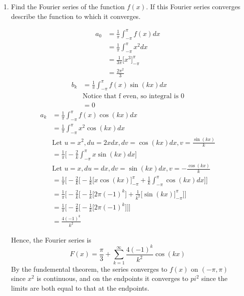 \documentclass{article}
\begin{document}
\begin{enumerate}
\begin{enumerate}
\item Find the Fourier series of the function $f(x)$. If this Fourier series converges describe the function to which it converges.
\begin{multicols}{2}
    \noindent
    \begin{align*}
        a_0 &= \frac{1}{\pi} \int_{-\pi}^{\pi} f(x) dx\\
        &= \frac{1}{\pi} \int_{-\pi}^{\pi} x^2 dx\\
        &= \frac{1}{3\pi} \Big[x^3 \Big]_{-\pi}^{\pi}\\
        &= \frac{2\pi^2}{3}
    \end{align*}
    \begin{align*}
        b_k &= \frac{1}{\pi} \int_{-\pi}^{\pi}f(x)\sin(kx)dx \\
        &\text{Notice that f even, so integral is 0} \\
        &= 0
    \end{align*}
    \begin{align*}
        a_k &= \frac{1}{\pi} \int_{-\pi}^{\pi}f(x)\cos(kx) dx \\
        &= \frac{1}{\pi} \int_{-\pi}^{\pi}x^2\cos(kx) dx \\
        &\text{Let $u = x^2, du = 2xdx, dv = \cos(kx) dx, v = \frac{\sin(kx)}{k}$} \\
        &= \frac{1}{\pi} \Bigg[- \frac{2}{k}\int_{-\pi}^{\pi}x\sin(kx)dx\Bigg] \\
        &\text{Let $u = x, du = dx, dv = \sin(kx) dx, v = -\frac{\cos(kx)}{k}$} \\
        &= \frac{1}{\pi} \Bigg[- \frac{2}{k}\Big[ -\frac{1}{k}\Big[x\cos(kx)\Big]_{-\pi}^{\pi} + \frac{1}{k}\int_{-\pi}^{\pi}\cos(kx)dx \Big]\Bigg] \\
        &= \frac{1}{\pi} \Bigg[- \frac{2}{k}\Big[ -\frac{1}{k}\Big[2\pi(-1)^k\Big] + \frac{1}{k^2}\Big[\sin(kx)\Big]_{-\pi}^{\pi}\Big]\Bigg] \\
        &= \frac{1}{\pi} \Bigg[- \frac{2}{k}\Big[ -\frac{1}{k}\Big[2\pi(-1)^k\Big]\Big]\Bigg] \\
        &= \frac{4(-1)^k}{k^2}
    \end{align*}
\end{multicols}
Hence, the Fourier series is
\[
\displaystyle F(x) = \frac{\pi}{3} + \sum_{k=1}^{\infty} \frac{4(-1)^k}{k^2}\cos(kx)
\]
By the fundemental theorem, the series converges to $f(x)$ on $(-\pi,\pi)$ since $x^2$ is continuous, and on the endpoints it converges to $pi^2$ since the limits are both equal to that at the endpoints.

\end{enumerate}
\end{enumerate}
\end{document}
